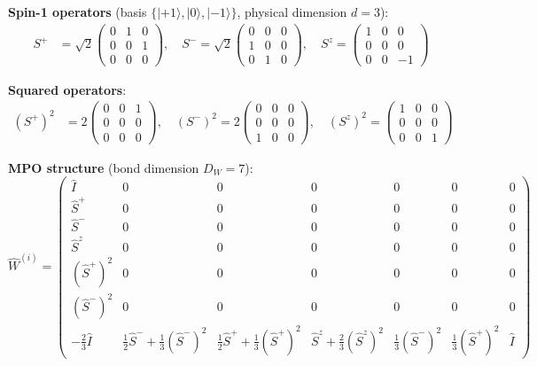 \documentclass[aps,prb,onecolumn,scriptaddress]{revtex4-2}
\begin{document}
	\textbf{Spin-1 operators} (basis $\{|+1\rangle, |0\rangle, |-1\rangle\}$, physical dimension $d=3$):
	\begin{align}
		S^+ &= \sqrt{2}\begin{pmatrix} 0 & 1 & 0 \\ 0 & 0 & 1 \\ 0 & 0 & 0 \end{pmatrix}, \quad
		S^- = \sqrt{2}\begin{pmatrix} 0 & 0 & 0 \\ 1 & 0 & 0 \\ 0 & 1 & 0 \end{pmatrix}, \quad
		S^z = \begin{pmatrix} 1 & 0 & 0 \\ 0 & 0 & 0 \\ 0 & 0 & -1 \end{pmatrix}
	\end{align}
	
	\textbf{Squared operators}:
	\begin{align}
		(S^+)^2 &= 2\begin{pmatrix} 0 & 0 & 1 \\ 0 & 0 & 0 \\ 0 & 0 & 0 \end{pmatrix}, \quad
		(S^-)^2 = 2\begin{pmatrix} 0 & 0 & 0 \\ 0 & 0 & 0 \\ 1 & 0 & 0 \end{pmatrix}, \quad
		(S^z)^2 = \begin{pmatrix} 1 & 0 & 0 \\ 0 & 0 & 0 \\ 0 & 0 & 1 \end{pmatrix}
	\end{align}
	
	\textbf{MPO structure} (bond dimension $D_W = 7$):
	\begin{equation}
		\hat{W}^{(i)} = \begin{pmatrix}
			\hat{I} & 0 & 0 & 0 & 0 & 0 & 0 \\
			\hat{S}^+ & 0 & 0 & 0 & 0 & 0 & 0 \\
			\hat{S}^- & 0 & 0 & 0 & 0 & 0 & 0 \\
			\hat{S}^z & 0 & 0 & 0 & 0 & 0 & 0 \\
			(\hat{S}^+)^2 & 0 & 0 & 0 & 0 & 0 & 0 \\
			(\hat{S}^-)^2 & 0 & 0 & 0 & 0 & 0 & 0 \\
			-\frac{2}{3}\hat{I} & \frac{1}{2}\hat{S}^- + \frac{1}{3}(\hat{S}^-)^2 & \frac{1}{2}\hat{S}^+ + \frac{1}{3}(\hat{S}^+)^2 & \hat{S}^z + \frac{2}{3}(\hat{S}^z)^2 & \frac{1}{3}(\hat{S}^-)^2 & \frac{1}{3}(\hat{S}^+)^2 & \hat{I}
		\end{pmatrix}
	\end{equation}
	
\end{document}
